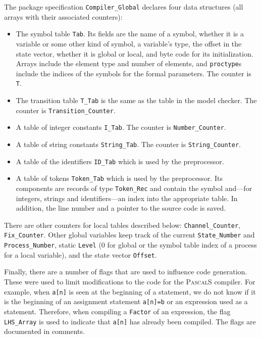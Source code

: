 \documentclass[11pt]{article}
\newcommand*{\p}[1]{\texttt{#1}}
\begin{document}
The package specification \p{Compiler\_Global} declares four data structures (all
arrays with their associated counters):
\begin{itemize}

\item The symbol table \p{Tab}. Its fields are the name of a symbol,
whether it is a variable or some other kind of symbol, a variable's
type, the offset in the state vector, whether it is global or local, and
byte code for its initialization. Arrays include the element type and
number of elements, and \p{proctype}s include the indices of the symbols
for the formal parameters. The counter is \p{T}.

\item The transition table \p{T\_Tab} is the same as the table in the
model checker. The counter is \p{Transition\_Counter}.

\item A table of integer constants \p{I\_Tab}. The counter is
\p{Number\_Counter}.

\item A table of string constants \p{String\_Tab}. The counter is
\p{String\_Counter}.

\item A table of the identifiers \p{ID\_Tab} which is used by the
preprocessor.

\item A table of tokens \p{Token\_Tab} which is used by the preprocessor.
Its components are records of type \p{Token\_Rec} and contain the symbol
and---for integers, strings and identifiers---an index into the
appropriate table. In addition, the line number and a pointer to the
source code is saved. 

\end{itemize}

There are other counters for local tables described below:
\p{Channel\_Counter}, \p{Fix\_Counter}. Other global variables keep
track of the current \p{State\_Number} and \p{Process\_Number}, static
\p{Level} (0 for global or the symbol table index of a process for a
local variable), and the state vector \p{Offset}.

Finally, there are a number of flags that are used to influence code
generation. These were used to limit modifications to the code for the
\textsc{PascalS} compiler. For example, when \p{a[n]} is seen at the
beginning of a statement, we do not know if it is the beginning of an
assignment statement \p{a[n]=b} or an expression used as a statement.
Therefore, when compiling a \p{Factor} of an expression, the flag
\p{LHS\_Array} is used to indicate that \p{a[n]} has already been compiled.
The flags are documented in comments.
\end{document}
